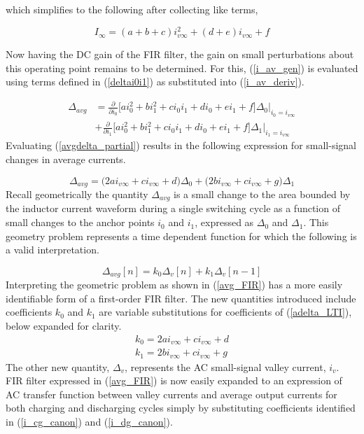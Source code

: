 \documentclass[conference]{IEEEtran}
\begin{document}
which simplifies to the following after collecting like terms,

\begin{equation}
I_{\infty} = (a + b +c)i_{v \infty}^2 + (d+e)i_{v \infty} + f
\label{iavg_steady_state}
\end{equation}

Now having the DC gain of the FIR filter, the gain on small perturbations about this operating point remains to be determined.  For this,  (\ref{i_av_gen}) is evaluated using terms defined in (\ref{deltai0i1}) as substituted into (\ref{i_av_deriv}).

\begin{align}
	\Delta_{avg} &= 
	\frac{\partial}{\partial i_0} 
	\bigg [
	a i_0^2+b i_1^2+c i_0i_1+d i_0+e i_1+f \bigg ] 
	\Delta_0 \bigg |_{i_0=i_{v\infty}} \nonumber \\
	&+ 
	\frac{\partial}{\partial i_1} 
	\bigg [
	a i_0^2+b i_1^2+c i_0i_1+d i_0+e i_1+f \bigg ] 
	\Delta_1 \bigg |_{i_1=i_{v\infty}}
	\label{avgdelta_partial}
\end{align}
Evaluating (\ref{avgdelta_partial}) results in the following expression for small-signal changes in average currents.

\begin{equation}
	\Delta_{avg} = \big ( 2 a i_{v\infty} + c i_{v\infty} + d  \big) \Delta_0 + 
	\big ( 2 b i_{v\infty} + c i_{v\infty} + g  \big) \Delta_1
	\label{adelta_LTI}
\end{equation}
Recall geometrically the quantity $\Delta_{avg}$ is a small change to the area bounded by the inductor current waveform during a single switching cycle as a function of small changes to the anchor points $i_0$ and $i_1$, expressed as $\Delta_0$ and $\Delta_1$. This geometry problem represents a time dependent function for which the following is a valid interpretation.

\begin{equation}
		\Delta_{avg} [n] = k_0 \Delta_v[n] + 
	k_1 \Delta_v [n-1]
	\label{avg_FIR}
\end{equation}
Interpreting the geometric problem as shown in (\ref{avg_FIR}) has a more easily identifiable form of a first-order FIR filter. The new quantities introduced include coefficients $k_0$ and $k_1$ are variable substitutions for coefficients of (\ref{adelta_LTI}), below expanded for clarity.
\begin{align}
	k_0 = 2 a i_{v\infty} + c i_{v\infty} + d \nonumber \\
	k_1 = 2 b i_{v\infty} + c i_{v\infty} + g 
\end{align}
The other new quantity, $\Delta_v$, represents the AC small-signal valley current, $i_v$.  FIR filter expressed in (\ref{avg_FIR}) is now easily expanded to an expression of AC transfer function between valley currents and average output currents for both charging and discharging cycles simply by substituting coefficients identified in (\ref{i_cg_canon}) and (\ref{i_dg_canon}). 
\end{document}
